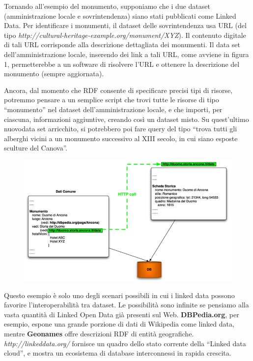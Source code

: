 Tornando all’esempio del monumento, supponiamo che i due dataset (amministrazione locale e sovrintendenza) siano stati pubblicati come Linked Data. Per identificare i monumenti, il dataset delle sovrintendenza usa URL (del tipo \emph{http://cultural-heritage-example.org/monument/XYZ}). Il contenuto digitale di tali URL corrisponde alla descrizione dettagliata dei monumenti.
Il data set dell’amministrazione locale, inserendo dei link a tali URL, come avviene in figura 1, permetterebbe a un software di risolvere l’URL e ottenere la descrizione del monumento (sempre aggiornata).

Ancora, dal momento che RDF consente di specificare precisi tipi di risorse, potremmo pensare a un semplice script che trovi tutte le risorse di tipo “monumento” nel dataset dell’amministrazione locale, e che importi, per ciascuna, informazioni aggiuntive, creando così un dataset misto. Su quest’ultimo nuovodata set arricchito, si potrebbero poi fare query del tipo “trova tutti gli alberghi vicini a un monumento successivo al XIII secolo, in cui siano esposte sculture del Canova”.

\begin{figure}
\centering\includegraphics[width=.8\textwidth]{./images/img2}
\end{figure}
Questo esempio è solo uno degli scenari possibili in cui i linked data possono favorire l’interoperabilità tra dataset. Le possibilità sono infinite se pensiamo alla vasta quantità di Linked Open Data già presenti sul Web. \textbf{DBPedia.org}, per esempio, espone una grande porzione di dati di Wikipedia come linked data, mentre \textbf{Geonames} offre descrizioni RDF di entità geografiche. \emph{http://linkeddata.org/} fornisce un quadro dello stato corrente della “Linked data cloud”, e mostra un ecosistema di database interconnessi in rapida crescita.
